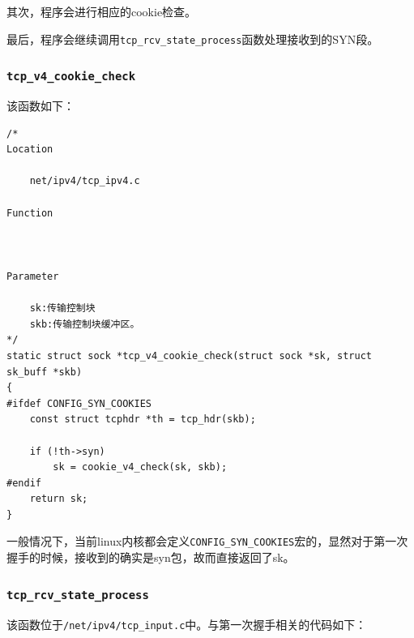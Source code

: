                 其次，程序会进行相应的cookie检查。

                最后，程序会继续调用\texttt{tcp_rcv_state_process}函数处理接收到的SYN段。
            
            \subsubsection{\texttt{tcp_v4_cookie_check}}
                该函数如下：
\begin{verbatim}
/*
Location

	net/ipv4/tcp_ipv4.c

Function

	

Parameter

	sk:传输控制块
	skb:传输控制块缓冲区。	
*/
static struct sock *tcp_v4_cookie_check(struct sock *sk, struct sk_buff *skb)
{
#ifdef CONFIG_SYN_COOKIES
    const struct tcphdr *th = tcp_hdr(skb);

    if (!th->syn)
        sk = cookie_v4_check(sk, skb);
#endif
    return sk;
}
\end{verbatim}

                一般情况下，当前linux内核都会定义\texttt{CONFIG_SYN_COOKIES}宏的，显然对于第一次握手的时候，接收到的确实是syn包，故而直接返回了sk。
            \subsubsection{\texttt{tcp_rcv_state_process}}
                该函数位于\texttt{/net/ipv4/tcp_input.c}中。与第一次握手相关的代码如下：

